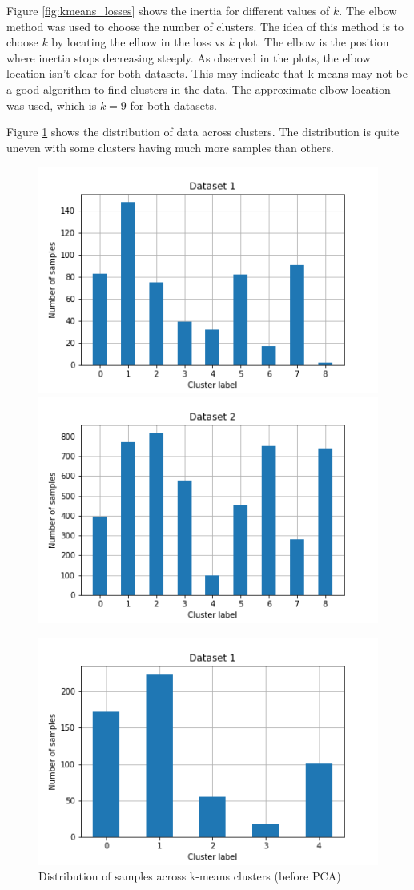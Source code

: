 \documentclass[letterpaper]{article}
\begin{document}
	Figure \ref{fig:kmeans_losses} shows the inertia for different values of $k$. The elbow method was used to choose the number of clusters. The idea of this method is to choose $k$ by locating the elbow in the loss vs $k$ plot. The elbow is the position where inertia stops decreasing steeply. As observed in the plots, the elbow location isn't clear for both datasets. This may indicate that k-means may not be a good algorithm to find clusters in the data. The approximate elbow location was used, which is $k = 9$ for both datasets.

	Figure \ref{fig:kmeans_hist} shows the distribution of data across clusters. The distribution is quite uneven with some clusters having much more samples than others.
	
	\begin{figure}
		\centering
		\begin{minipage}{.48\textwidth}
			\centering
			\includegraphics[width=.5\linewidth]{../../plots/kmeans_hist_1}%
			\centering
			\includegraphics[width=.5\linewidth]{../../plots/kmeans_hist_2}
			\caption{Distribution of samples across k-means clusters (before PCA)}
			\label{fig:kmeans_hist}%
		\end{minipage}%
		\hfill
		\begin{minipage}{.48\textwidth}
			\centering
			\includegraphics[width=.5\linewidth]{../../plots/gmm_hist_1}%

\end{minipage}
\end{figure}
\end{document}

